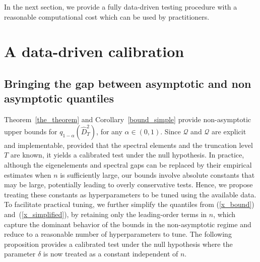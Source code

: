 \documentclass[twoside,11pt]{article}
\newcommand{\nb}{n}
\newcommand{\trueq}[1]{q_{1-\alpha}(#1) }
\newcommand{\qmaj}{\mathcal{Q}}
\newcommand{\qmajbis}{\mathscr{Q}}
\begin{document}
In the next section, we provide a fully data-driven testing procedure with a reasonable computational cost which can be used by practitioners. 
\section{A data-driven calibration}\label{sec:datadriven}
\subsection{Bringing the gap between asymptotic and non asymptotic quantiles}
\label{sec:simplified:asym}
 Theorem~\ref{the_theorem} and Corollary~\ref{bound_simple} provide non-asymptotic upper bounds for $\trueq{\widehat{D}^2_T}$, for any $\alpha \in (0,1)$. Since $\qmaj$ and $\qmajbis$ are explicit and implementable, provided that the spectral elements and the truncation level $T$ are known, it yields a calibrated test under the null hypothesis. In practice, although the eigenelements and spectral gaps can be replaced by their empirical estimates when $\nb$ is sufficiently large, our bounds involve absolute constants that may be large, potentially leading to overly conservative tests. Hence, we propose treating these constants as hyperparameters to be tuned using the available data. To facilitate practical tuning, we further simplify the quantiles from (\ref{x_bound}) and~(\ref{x_simplified}), by retaining only the leading-order terms in $\nb$, which capture the dominant behavior of the bounds in the non-asymptotic regime and reduce to a reasonable number of hyperparameters to tune. The following proposition provides a calibrated test under the null hypothesis where the parameter $\delta$ is now treated as a constant independent of $\nb$.
\end{document}
